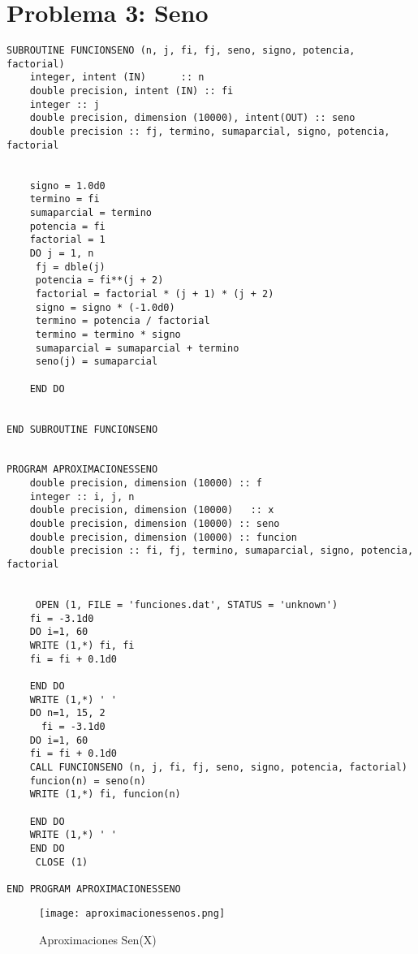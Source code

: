 \documentclass{article}
\begin{document}
\section{Problema 3: Seno}
\begin{verbatim}
SUBROUTINE FUNCIONSENO (n, j, fi, fj, seno, signo, potencia, factorial)
	integer, intent (IN)      :: n
	double precision, intent (IN) :: fi
	integer :: j
	double precision, dimension (10000), intent(OUT) :: seno
	double precision :: fj, termino, sumaparcial, signo, potencia, factorial

	
	signo = 1.0d0
	termino = fi
	sumaparcial = termino
	potencia = fi
	factorial = 1
	DO j = 1, n
	 fj = dble(j)
	 potencia = fi**(j + 2)
	 factorial = factorial * (j + 1) * (j + 2)
	 signo = signo * (-1.0d0)
	 termino = potencia / factorial
	 termino = termino * signo
	 sumaparcial = sumaparcial + termino
	 seno(j) = sumaparcial
	 
	END DO

	 
END SUBROUTINE FUNCIONSENO
	 

PROGRAM APROXIMACIONESSENO
	double precision, dimension (10000) :: f
	integer :: i, j, n
	double precision, dimension (10000)   :: x
	double precision, dimension (10000) :: seno
	double precision, dimension (10000) :: funcion
	double precision :: fi, fj, termino, sumaparcial, signo, potencia, factorial
	

     OPEN (1, FILE = 'funciones.dat', STATUS = 'unknown')
	fi = -3.1d0
	DO i=1, 60
	WRITE (1,*) fi, fi
	fi = fi + 0.1d0
	
	END DO
	WRITE (1,*) ' '
	DO n=1, 15, 2
	  fi = -3.1d0
	DO i=1, 60
	fi = fi + 0.1d0
	CALL FUNCIONSENO (n, j, fi, fj, seno, signo, potencia, factorial)
	funcion(n) = seno(n)
	WRITE (1,*) fi, funcion(n)

	END DO
	WRITE (1,*) ' '
	END DO
     CLOSE (1)

END PROGRAM APROXIMACIONESSENO
\end{verbatim}

\begin{figure}[h!]
  \texttt{[image: aproximacionessenos.png]}
  \caption{Aproximaciones Sen(X)}
  \label{fi}
\end{figure}
\end{document}

